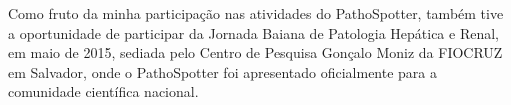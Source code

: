 \documentclass[final]{beamer}
\begin{document}
\begin{frame}[t]
\begin{multicols}{2}
Como fruto da minha participação nas atividades do PathoSpotter, também tive a oportunidade de participar da Jornada Baiana de Patologia Hepática e Renal, em maio de 2015, sediada pelo Centro de Pesquisa Gonçalo Moniz da FIOCRUZ em Salvador, onde o PathoSpotter foi apresentado oficialmente para a comunidade científica nacional.




%
%	
%	
%	
%	


\end{multicols}

\end{frame}
\end{document}
